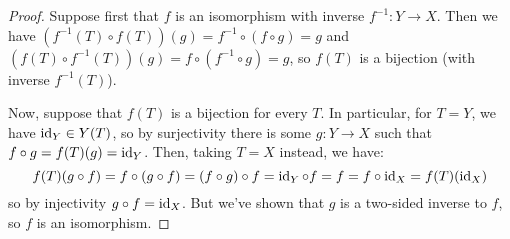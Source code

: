 \begin{proof}
	Suppose first that $f$ is an isomorphism with inverse $f^{-1} : Y \to X$. Then we have $(f^{-1}(T) \circ f(T))(g) = f^{-1} \circ (f \circ g) = g$ and $(f(T) \circ f^{-1}(T))(g) = f \circ (f^{-1} \circ g) = g$, so $f(T)$ is a bijection (with inverse $f^{-1}(T)$).
	
	Now, suppose that $f(T)$ is a bijection for every $T$. In particular, for $T = Y$, we have $\operatorname{id}_Y \in Y(T)$, so by surjectivity there is some $g : Y \to X$ such that $f \circ g = f(T)(g) = \operatorname{id}_Y$. Then, taking $T = X$ instead, we have:
	\[ f(T)(g \circ f) = f \circ (g \circ f) = (f \circ g) \circ f = \operatorname{id}_Y \circ f = f = f \circ \operatorname{id}_X = f(T)(\operatorname{id}_X) \]
	so by injectivity $g \circ f = \operatorname{id}_X$. But we've shown that $g$ is a two-sided inverse to $f$, so $f$ is an isomorphism.
\end{proof}
